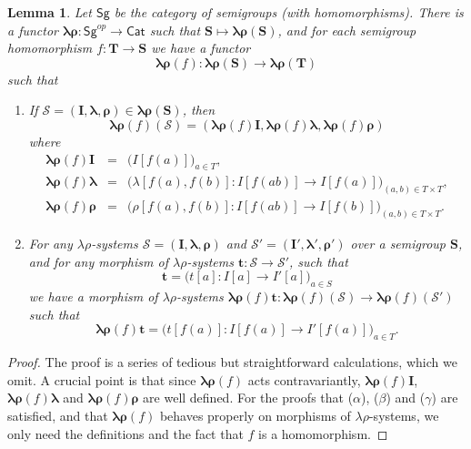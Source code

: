 \documentclass{amsart}
\newtheorem{lemma}{Lemma}
\newcommand{\blambda}{\boldsymbol{\lambda}}
\newcommand{\brho}{\boldsymbol{\rho}}
\begin{document}
\begin{lemma}
Let\/ $\mathsf{Sg}$ be the category of semigroups
\textup{(}with homomorphisms\textup{)}.  
There is a functor $\bm{\lambda\rho}\colon \mathsf{Sg}^{op}\to
\mathsf{Cat}$ such that $\mathbf S\mapsto \bm{\lambda\rho}(\mathbf S)$, and
for each semigroup homomorphism $f\colon \mathbf T\to\mathbf S$
we have a functor 
$$
\bm{\lambda\rho}(f)\colon \bm{\lambda\rho}(\mathbf S)\longrightarrow
\bm{\lambda\rho}(\mathbf T)
$$
such that 
\begin{enumerate}
\item If $\mathcal{S} = (\mathbf{I},\blambda,\brho)\in
\bm{\lambda\rho}(\mathbf S)$, then
$$
\bm{\lambda\rho}(f)(\mathcal{S}) =
(\bm{\lambda\rho}(f)\mathbf{I},\bm{\lambda\rho}(f)\blambda,
\bm{\lambda\rho}(f)\brho)
$$ 
where 
\begin{eqnarray*}
\bm{\lambda\rho}(f)\mathbf{I} &=& \bigl(I[f(a)]\bigr)_{a\in T},\\
\bm{\lambda\rho}(f)\blambda &=&
\bigl(\lambda[f(a),f(b)]\colon
I[f(ab)]\to I[f(a)]\bigr)_{(a,b)\in T\times T},\\
\bm{\lambda\rho}(f)\brho &=&
\bigl(\rho[f(a),f(b)]\colon
I[f(ab)]\to I[f(b)]\bigr)_{(a,b)\in T\times T}.
\end{eqnarray*}
\item For any $\lambda\rho$-systems $\mathcal{S} = (\mathbf{I},\blambda,\brho)$ and
$\mathcal{S}' = (\mathbf{I}',\blambda',\brho')$ over a semigroup
$\mathbf{S}$, and for any morphism of $\lambda\rho$-systems
$\mathbf{t}\colon \mathcal{S}\to\mathcal{S}'$, such that 
$$
\mathbf{t} = \bigl(t[a]\colon I[a]\longrightarrow I'[a]\bigr)_{a\in S}
$$
we have a morphism of $\lambda\rho$-systems
$\bm{\lambda\rho}(f)\mathbf{t}\colon
\bm{\lambda\rho}(f)(\mathcal{S})\to \bm{\lambda\rho}(f)(\mathcal{S}')$
such that
$$
\bm{\lambda\rho}(f)\mathbf{t} =
\bigl(t[f(a)]\colon I[f(a)]\longrightarrow I'[f(a)]\bigr)_{a\in T}.
$$
\end{enumerate}
\end{lemma}
\begin{proof}
The proof is a series of tedious but straightforward calculations, which we
omit. A crucial point is that since $\bm{\lambda\rho}(f)$ acts contravariantly,
$\bm{\lambda\rho}(f)\mathbf{I}$, 
$\bm{\lambda\rho}(f)\blambda$ and $\bm{\lambda\rho}(f)\brho$ are 
well defined. For the proofs that ($\alpha$), ($\beta$) and ($\gamma$) are
satisfied, and that $\bm{\lambda\rho}(f)$ behaves properly on morphisms of
$\lambda\rho$-systems, we only need the definitions and the fact that $f$ is a
homomorphism. 
\end{proof}
\end{document}
